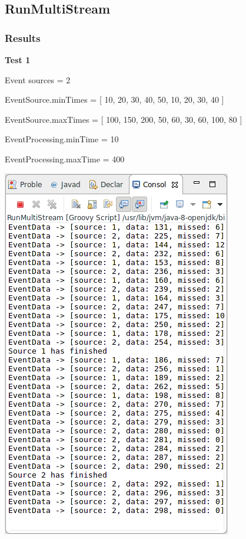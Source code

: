 \subsection{RunMultiStream}

\subsubsection*{Results}

\textbf{Test 1}

Event sources = 2

EventSource.minTimes = [ 10, 20, 30, 40, 50, 10, 20, 30, 40 ]

EventSource.maxTimes = [ 100, 150, 200, 50, 60, 30, 60, 100, 80 ]

EventProcessing.minTime = 10

EventProcessing.maxTime = 400

\includegraphics[width=\textwidth/2]{img/screenshots/9-2-1.png}

